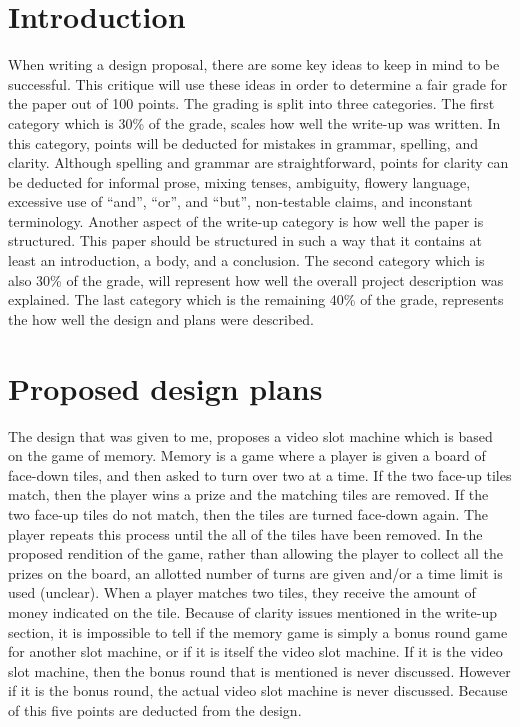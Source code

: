 \section{Introduction}
When writing a design proposal, there are some key ideas to keep in mind to be successful. This 
critique will use these ideas in order to determine a fair grade for the paper out of 100 points.
The grading is split into three categories.  The first category which is 30\% of the grade, scales 
how well the write-up was written. In this category, points will be deducted for mistakes in 
grammar, spelling, and clarity.  Although spelling and grammar are straightforward, points for 
clarity can be deducted for informal prose, mixing tenses, ambiguity, flowery language,
excessive use of ``and'', ``or'', and ``but'', non-testable claims, and inconstant terminology.
Another aspect of the write-up category is how well the paper is structured.  This paper should
be structured in such a way that it contains at least an introduction, a body, and a conclusion.
The second category which is also 30\% of the grade, will represent how well the overall project 
description was explained.  The last category which is the remaining 40\% of the grade, represents the how
well the design and plans were described.

\section{Proposed design plans}
The design that was given to me, proposes a video slot machine which is based on the game
of memory.  Memory is a game where a player is given a board of face-down tiles, and then
asked to turn over two at a time.  If the two face-up tiles match, then the player wins a
prize and the matching tiles are removed.  If the two face-up tiles do not match, then the
tiles are turned face-down again.  The player repeats this process until the all of the tiles
have been removed.  In the proposed rendition of the game, rather than allowing the player to collect
all the prizes on the board, an allotted number of turns are given and/or a time limit is used
(unclear).  When a player matches two tiles, they receive the amount of money indicated on
the tile.  Because of clarity issues mentioned in the write-up section, it is impossible to
tell if the memory game is simply a bonus round game for another slot machine, or if it is
itself the video slot machine.  If it is the video slot machine, then the bonus round that
is mentioned is never discussed.  However if it is the bonus round, the actual video slot
machine is never discussed.  Because of this five points are deducted from the design.


